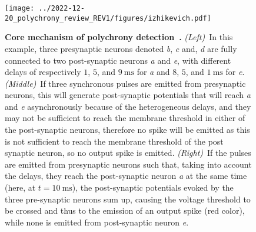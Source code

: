 \documentclass[brainsci, %
               review,submit,pdftex,moreauthors
               ]{Definitions/mdpi}
\newcommand{\ms}{\si{\milli\second}}%
\begin{document}
%
\begin{figure}[H]%
  \centering
  \texttt{[image: ../2022-12-20\_polychrony\_review\_REV1/figures/izhikevich.pdf]}%
    \caption{\textbf{Core mechanism of polychrony detection~\citep{izhikevich_polychronization_2006}.} \emph{(Left)}~In this example, three presynaptic neurons denoted \emph{b}, \emph{c} and, \emph{d} are fully connected to two post-synaptic neurons \emph{a} and \emph{e}, with different delays of respectively $1$, $5$, and $9~\ms$ for \emph{a} and  $8$, $5$, and $1~\ms$ for \emph{e}. \emph{(Middle)}~If three synchronous pulses are emitted from presynaptic neurons, this will generate post-synaptic potentials that will reach \emph{a} and \emph{e} asynchronously because of the heterogeneous delays, and they may not be sufficient to reach the membrane threshold in either of the post-synaptic neurons, therefore no spike will be emitted as this is not sufficient to reach the membrane threshold of the post synaptic neuron, so no output spike is emitted.
    \emph{(Right)}~If the pulses are emitted from presynaptic neurons such that, taking into account the delays, they reach the post-synaptic neuron \emph{a} at the same time (here, at $t=10~\ms$),  the post-synaptic potentials evoked by the three pre-synaptic neurons sum up, causing the voltage threshold to be crossed and thus to the emission of an output spike (red color), while none is emitted from post-synaptic neuron \emph{e}.
     }
  \label{fig:izhikevich}
\end{figure}
% 
 
\end{document}
